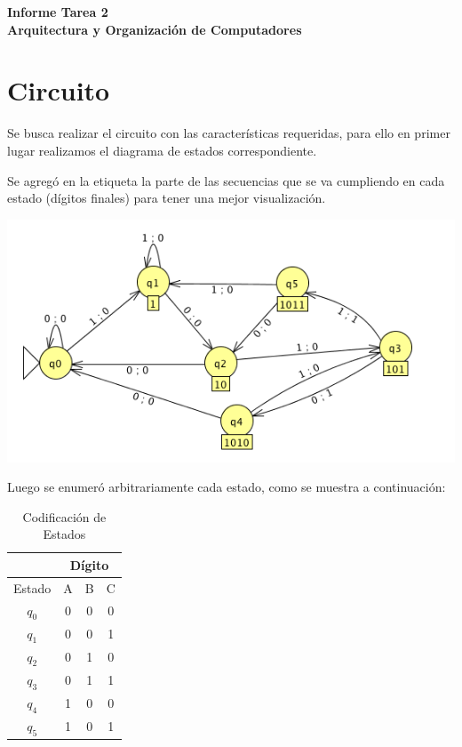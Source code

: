 \documentclass[11pt,letterpaper]{article}
\newcommand{\titulo}{Informe Tarea 2 \\ Arquitectura y Organización de Computadores}
\renewcommand{\maketitle}
{
\thispagestyle{fancy}
\begin{center}
\begin{Large}
\textbf{\titulo}\\
\end{Large}
\end{center}
\vspace{0.3cm}
}
\begin{document}
\setcounter{secnumdepth}{0}
\maketitle
\section{Circuito}
Se busca realizar el circuito con las características requeridas, para ello en primer lugar realizamos el diagrama de estados correspondiente.

Se agregó en la etiqueta la parte de las secuencias que se va cumpliendo en cada estado (dígitos finales) para tener una mejor visualización.
\begin{center}
\includegraphics[width=15cm]{diag-estados.png}
\end{center}

Luego se enumeró arbitrariamente cada estado, como se muestra a continuación:
\vspace{0.2cm}
\begin{table}[h]
\centering
\caption{Codificación de Estados}
\vspace{0.2cm}
\begin{tabular}{c|c|c|c|}
\cline{2-4}
                             & \multicolumn{3}{c|}{Dígito} \\ \hline
\multicolumn{1}{|c|}{Estado} & A       & B       & C       \\ \hline
\multicolumn{1}{|c|}{$q_0$}     & 0       & 0       & 0       \\ \hline
\multicolumn{1}{|c|}{$q_1$}     & 0       & 0       & 1       \\ \hline
\multicolumn{1}{|c|}{$q_2$}     & 0       & 1       & 0       \\ \hline
\multicolumn{1}{|c|}{$q_3$}     & 0       & 1       & 1       \\ \hline
\multicolumn{1}{|c|}{$q_4$}     & 1       & 0       & 0       \\ \hline
\multicolumn{1}{|c|}{$q_5$}     & 1       & 0       & 1       \\ \hline
\end{tabular}
\end{table}
\end{document}
